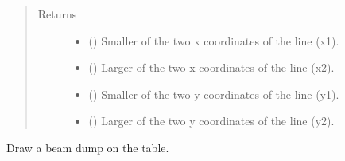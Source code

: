 \documentclass[letterpaper,10pt,english]{sphinxmanual}
\begin{document}
\begin{fulllineitems}
\begin{fulllineitems}
\begin{quote}
\begin{description}
\begin{itemize}
\end{itemize}

\item[{Returns}] \leavevmode
\sphinxAtStartPar
\begin{itemize}
\item {} 
\sphinxAtStartPar
{} () \textendash{} Smaller of the two x coordinates of the line (x1).

\item {} 
\sphinxAtStartPar
{} () \textendash{} Larger of the two x coordinates of the line (x2).

\item {} 
\sphinxAtStartPar
{} () \textendash{} Smaller of the two y coordinates of the line (y1).

\item {} 
\sphinxAtStartPar
{} () \textendash{} Larger of the two y coordinates of the line (y2).

\end{itemize}


\end{description}\end{quote}

\end{fulllineitems}


\begin{fulllineitems}
\label{\detokenize{index:pyopticaltable.OpticalTable.beam_dump}}
\sphinxAtStartPar
Draw a beam dump on the table.


\end{fulllineitems}
\end{fulllineitems}
\end{document}
